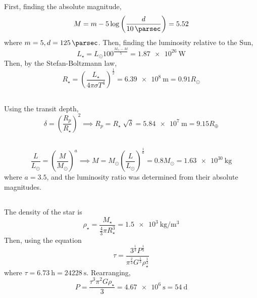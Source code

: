 \documentclass{article}
\begin{document}
\subsection{}

First, finding the absolute magnitude,
\begin{equation}
    M = m - 5 \log\left(\frac{d}{\SI{10}{\parsec}}\right) = \num{5.52}
\end{equation}
where \(m = 5, d = \SI{125}{\parsec}\).
Then, finding the luminosity relative to the Sun,
\begin{equation}
    L_\star = L_\odot 100^{\frac{M_\odot - M}{5}} = \SI{1.87e26}{\watt}
\end{equation}
Then, by the Stefan-Boltzmann law,
\begin{equation}
    R_\star = \left(\frac{L_\star}{4 \pi \sigma T^4}\right)^{\frac{1}{2}} = \SI{6.39e+8}{\meter} = 0.91 R_\odot
\end{equation}

\subsection{}

Using the transit depth,
\begin{equation}
    \delta = \left(\frac{R_p}{R_\star}\right)^2 \implies R_p = R_\star \sqrt[]{\delta} = \SI{5.84e+7}{\meter} = 9.15 R_\oplus
\end{equation}

\subsection{}

\begin{equation}
    \frac{L}{L_\odot} = \left(\frac{M}{M_\odot}\right)^a \implies M = M_\odot \left(\frac{L}{L_\odot}\right)^\frac{1}{a} = 0.8 M_\odot = \SI{1.63e+30}{\kilogram}
\end{equation}
where \(a = 3.5\), and the luminosity ratio was determined from their absolute magnitudes.

\subsection{}

The density of the star is
\begin{equation}
    \rho_\star = \frac{M_\star}{\frac{4}{3} \pi R_\star^3} = \SI{1.5e+3}{\kilogram\per\meter\cubed}
\end{equation}
Then, using the equation
\begin{equation}
    \tau = \frac{3^{\frac{1}{3}} P^{\frac{1}{3}}}{\pi^{\frac{2}{3}} G^{\frac{1}{3}} \rho_\star^{\frac{1}{3}}}
\end{equation}
where \(\tau = \SI{6.73}{\hour} = \SI{24228}{\second}\).
Rearranging,
\begin{equation}
    P = \frac{\tau^3 \pi^2 G \rho_\star}{3} = \SI{4.67e+6}{\second} = \SI{54}{\day}
\end{equation}
\end{document}
